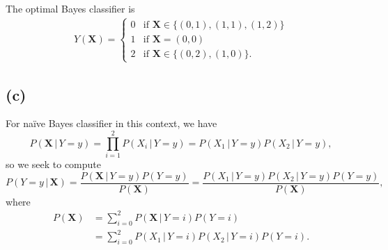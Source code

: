 \documentclass[10pt]{article}
\begin{document}
The optimal Bayes classifier is
\begin{align*}
Y(\textbf{X}) = \begin{cases}
0 & \mbox{if } \textbf{X} \in \{ (0, 1), (1, 1), (1, 2) \} \\ 
1 & \mbox{if } \textbf{X} = (0, 0) \\
2 & \mbox{if } \textbf{X} \in \{ (0, 2), (1, 0) \}.
\end{cases}
\end{align*}

\subsection*{(c)}
For naïve Bayes classifier in this context, we have
\[
P(\textbf{X} \, | \, Y = y) = \prod_{i = 1}^2 P(X_i \, | \, Y = y) = P(X_1 \, | \, Y = y)P(X_2 \, | \, Y = y),
\]
so we seek to compute
\[
P(Y = y \, | \, \textbf{X}) = \frac{ P(\textbf{X} \, | \, Y = y)P(Y = y) }{ P(\textbf{X}) } = \frac{ P(X_1 \, | \, Y = y) P(X_2 \, | \, Y = y) P(Y = y) }{ P(\textbf{X}) },
\]
where 
\begin{align*}
P(\textbf{X}) &= \sum_{i = 0}^2 P(\textbf{X} \, | \, Y = i)P(Y = i) \\
                    &= \sum_{i = 0}^2 P(X_1 \, | \, Y =i)P(X_2 \, | \, Y = i)P(Y = i).
\end{align*}
\end{document}
